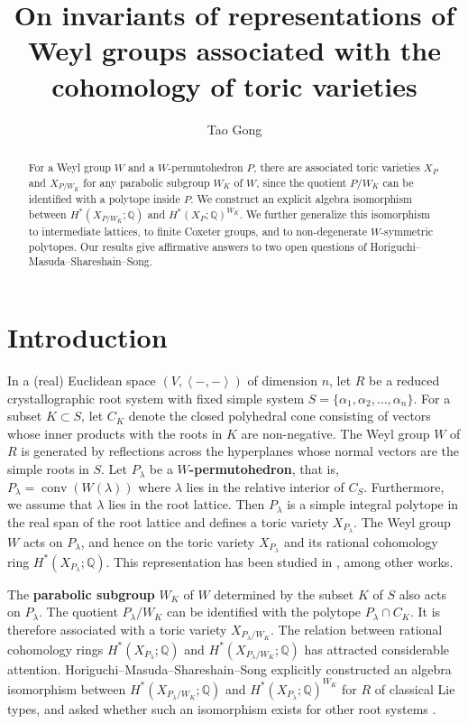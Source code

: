 \documentclass{amsart}
\title[On invariants of representations of Weyl groups]{On invariants of representations of Weyl groups associated with the cohomology of toric varieties}
\author{Tao Gong}
\theoremstyle{plain} \numberwithin{equation}{section}
\theoremstyle{definition}
\newcommand{\Q}{\mathbb{Q}}
\newcommand{\ip}[1]{\left\langle #1 \right\rangle}
\DeclareMathOperator{\conv}{conv}
\begin{document}
\begin{abstract}
  For a Weyl group $W$ and a $W$-permutohedron $P$, there are associated toric varieties $X_P$ and $X_{P/W_K}$ for any parabolic subgroup $W_K$ of $W$, since the quotient $P/W_K$ can be identified with a polytope inside $P$. 
  We construct an explicit algebra isomorphism between $H^*(X_{P/W_K};\Q)$ and $H^*(X_P;\Q)^{W_K}$. 
  We further generalize this isomorphism to intermediate lattices, to finite Coxeter groups, and to non-degenerate $W$-symmetric polytopes. 
  Our results give affirmative answers to two open questions of Horiguchi--Masuda--Shareshain--Song.
\end{abstract}
\maketitle





\section{Introduction}

In  a (real) Euclidean space $\left(V,\ip{-,-}\right)$ of dimension $n$, 
let $R$ be a reduced crystallographic root system with fixed simple system $S=\{\alpha_1,\alpha_2,\ldots,\alpha_n\}$.
 For a subset $K\subset S$, let $C_K$ denote the closed polyhedral cone consisting of vectors whose inner products with the roots in $K$ are non-negative.
 The Weyl group $W$ of $R$ is generated by reflections across the hyperplanes whose normal vectors are the simple roots in $S$.
 Let $P_{\lambda}$ be a \textbf{$W$-permutohedron}, that is, $P_{\lambda}=\conv\left(W(\lambda)\right)$ where $\lambda$ lies in the relative interior of $C_S$.
 Furthermore, we assume that  $\lambda$ lies in the root lattice. Then
  $P_{\lambda}$ is a simple integral polytope in the real span of the root lattice and defines a toric variety $X_{P_{\lambda}}$.
  The Weyl group $W$ acts on $P_{\lambda}$, and hence on the toric variety $X_{P_{\lambda}}$ and its rational cohomology ring $H^*(X_{P_{\lambda}};\Q)$. 
  This representation has been studied in \cite{procesiToricVarietyAssociated1990,stembridgePermutationRepresentationsWeyl1994,dolgachevCharacterFormulaRepresentation1994,lehrerRationalPointsCoxeter2008}, among other works.
 

 The \textbf{parabolic subgroup} $W_K$ of $W$ determined by the subset  $K$ of $S$ also acts on $P_{\lambda}$. 
 The quotient $P_{\lambda}/W_K$ can be identified with the polytope $P_{\lambda}\cap C_K$. 
 It is therefore associated with a toric variety $X_{P_{\lambda}/W_K}$.
  The relation between rational cohomology rings $H^*(X_{P_{\lambda}};\Q)$  and $H^*(X_{P_{\lambda}/W_K};\Q)$  has  attracted considerable attention. 
  Horiguchi--Masuda--Shareshain--Song \cite{horiguchiToricOrbifoldsAssociated2024} explicitly constructed an algebra isomorphism between $H^*(X_{P_{\lambda}/W_K};\Q)$ and $H^*(X_{P_{\lambda}};\Q)^{W_K}$ for $R$ of classical Lie types, and asked whether such an isomorphism exists for other root systems \cite[Questions 8.1, 8.2]{horiguchiToricOrbifoldsAssociated2024}.
\end{document}
